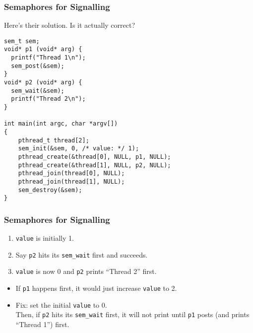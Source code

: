 \documentclass[aspectratio=43]{beamer}
\newenvironment{changemargin}[1]{%
  \begin{list}{}{%
    \setlength{\topsep}{0pt}%
    \setlength{\leftmargin}{#1}%
    \setlength{\rightmargin}{1em}
    \setlength{\listparindent}{\parindent}%
    \setlength{\itemindent}{\parindent}%
    \setlength{\parsep}{\parskip}%
  }%
  \item[]}{\end{list}}
\begin{document}
\begin{frame}[fragile]
  \frametitle{Semaphores for Signalling}

  \begin{changemargin}{1cm}
  Here's their solution. Is it actually correct?

  \begin{lstlisting}
sem_t sem;
void* p1 (void* arg) {
  printf("Thread 1\n");
  sem_post(&sem);
}
void* p2 (void* arg) {
  sem_wait(&sem);
  printf("Thread 2\n");
}

int main(int argc, char *argv[])
{
    pthread_t thread[2];
    sem_init(&sem, 0, /* value: */ 1);
    pthread_create(&thread[0], NULL, p1, NULL);
    pthread_create(&thread[1], NULL, p2, NULL);
    pthread_join(thread[0], NULL);
    pthread_join(thread[1], NULL);
    sem_destroy(&sem);
}
  \end{lstlisting}
\end{changemargin}

\end{frame}

\begin{frame}[fragile]
  \frametitle{Semaphores for Signalling}

  
  \begin{changemargin}{1cm}
  \begin{enumerate}
    \item {\tt value} is initially 1.
    \vfill
    \item Say {\tt p2} hits its {\tt sem\_wait} first and succeeds.
    \vfill
    \item {\tt value} is now 0 and {\tt p2} prints ``Thread 2'' first.
  \end{enumerate}
  \begin{itemize}
    \item If {\tt p1} happens first, it would just increase
      {\tt value} to 2.\vfill
    \item<2-> Fix: set the initial {\tt value} to \alert{0}.\\[1em]
Then, if {\tt p2} hits its {\tt sem\_wait} first, it will
      not print until {\tt p1} posts (and prints ``Thread 1'') first.
  \end{itemize}~\\[1em]

  \end{changemargin}

\end{frame}
\end{document}
